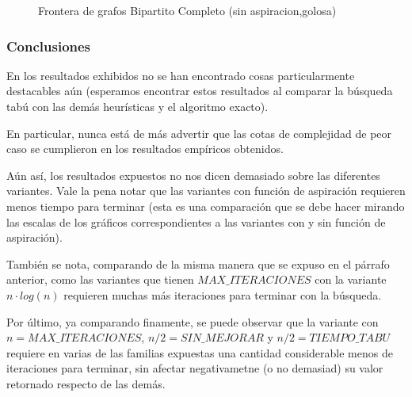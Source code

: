 \begin{figure}[H]
    \centering
    \fontsize{8}{10}\selectfont
    \resizebox{0.8\textwidth}{!}{}
    \caption{Frontera de grafos Bipartito Completo (sin aspiracion,golosa)}
\end{figure}

\subsubsection{Conclusiones}
\par En los resultados exhibidos no se han encontrado cosas particularmente
    destacables a\'un (esperamos encontrar estos resultados al comparar
    la b\'usqueda tab\'u con las dem\'as heur\'isticas y el algoritmo exacto).

\par En particular, nunca est\'a de m\'as advertir que las cotas de complejidad
    de peor caso se cumplieron en los resultados emp\'iricos obtenidos.

\par A\'un as\'i, los resultados expuestos no nos dicen demasiado sobre las
    diferentes variantes. Vale la pena notar que las variantes con
    funci\'on de aspiraci\'on requieren menos tiempo para terminar (esta
    es una comparaci\'on que se debe hacer mirando las escalas de los gr\'aficos
    correspondientes a las variantes con y sin funci\'on de aspiraci\'on).

\par Tambi\'en se nota, comparando de la misma manera que se expuso en el
    p\'arrafo anterior, como las variantes que tienen $MAX\_ITERACIONES$
    con la variante $n\cdot log(n)$ requieren muchas m\'as iteraciones
    para terminar con la b\'usqueda.

\par Por \'ultimo, ya comparando finamente, se puede observar que la variante
    con $n = MAX\_ITERACIONES$, $n/2 = SIN\_MEJORAR$ y $n/2 = TIEMPO\_TABU$
    requiere en varias de las familias expuestas una cantidad considerable
    menos de iteraciones para terminar, sin afectar negativametne (o no
    demasiad) su valor retornado respecto de las dem\'as.
